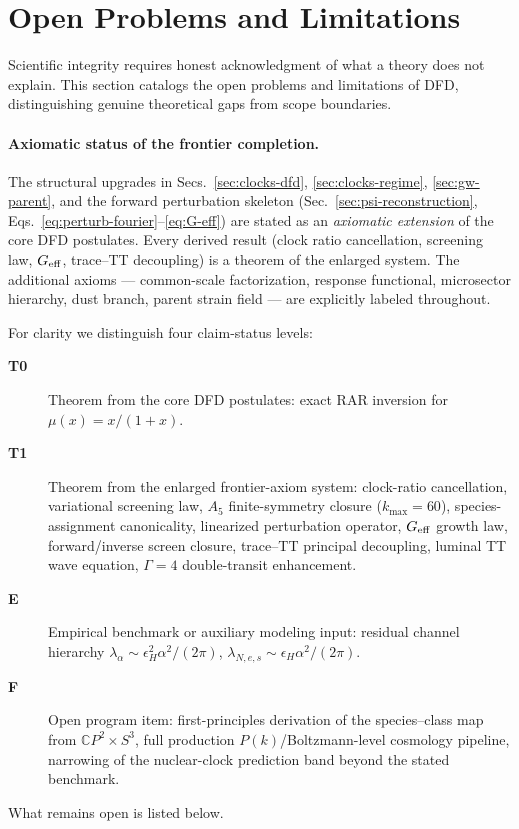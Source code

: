 
\section{Open Problems and Limitations}\label{sec:openproblems}

Scientific integrity requires honest acknowledgment of what a theory does not explain. This section catalogs the open problems and limitations of DFD, distinguishing genuine theoretical gaps from scope boundaries.

\paragraph{Axiomatic status of the frontier completion.}
The structural upgrades in Secs.~\ref{sec:clocks-dfd}, \ref{sec:clocks-regime}, \ref{sec:gw-parent}, and the forward perturbation skeleton (Sec.~\ref{sec:psi-reconstruction}, Eqs.~\eqref{eq:perturb-fourier}--\eqref{eq:G-eff}) are stated as an \emph{axiomatic extension} of the core DFD postulates.  Every derived result (clock ratio cancellation, screening law, $G_{\rm eff}$, trace--TT decoupling) is a theorem of the enlarged system.  The additional axioms --- common-scale factorization, response functional, microsector hierarchy, dust branch, parent strain field --- are explicitly labeled throughout.

For clarity we distinguish four claim-status levels:
\begin{description}
\item[\textbf{T0}] Theorem from the core DFD postulates: exact RAR inversion for $\mu(x)=x/(1+x)$.
\item[\textbf{T1}] Theorem from the enlarged frontier-axiom system: clock-ratio cancellation, variational screening law, $A_5$ finite-symmetry closure ($k_{\max}=60$), species-assignment canonicality, linearized perturbation operator, $G_{\rm eff}$ growth law, forward/inverse screen closure, trace--TT principal decoupling, luminal TT wave equation, $\Gamma=4$ double-transit enhancement.
\item[\textbf{E}] Empirical benchmark or auxiliary modeling input: residual channel hierarchy $\lambda_\alpha \sim \epsilon_H^2 \alpha^2/(2\pi)$, $\lambda_{N,e,s} \sim \epsilon_H \alpha^2/(2\pi)$.
\item[\textbf{F}] Open program item: first-principles derivation of the species--class map from $\mathbb{C}P^2 \times S^3$, full production $P(k)$/Boltzmann-level cosmology pipeline, narrowing of the nuclear-clock prediction band beyond the stated benchmark.
\end{description}
What remains open is listed below.

